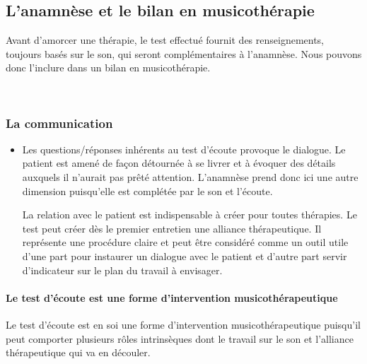 \subsection{L'anamnèse et le bilan en musicothérapie}

  Avant d'amorcer une thérapie, le test effectué fournit des renseignements, toujours basés sur le son, qui seront complémentaires à l'anamnèse. Nous pouvons donc l'inclure dans un  bilan en musicothérapie.

  \
\subsubsection{La communication}


  
\begin{itemize}
  \item Les questions/réponses inhérents au 
 test d'écoute provoque le dialogue. Le patient est amené de façon
 détournée à se livrer et à évoquer des détails auxquels il
 n'aurait pas prêté attention. L'anamnèse prend donc ici une autre
dimension puisqu'elle est complétée par le son et l'écoute.

	 La relation avec le patient est indispensable à créer pour toutes thérapies. Le test peut créer dès le premier entretien une alliance thérapeutique.
	Il représente une procédure claire et  peut être
        considéré comme un outil utile d'une part pour instaurer un dialogue avec
        le patient et d'autre part servir d'indicateur sur le plan du travail à
        envisager.
  \end{itemize}      
\paragraph{Le test d'écoute est une forme d'intervention
  musicothérapeutique}

Le test d'écoute est en soi une forme d'intervention
 musicothérapeutique puisqu'il peut
 comporter plusieurs rôles intrinsèques dont le travail sur le son et
 l'alliance thérapeutique qui va en découler.
 


